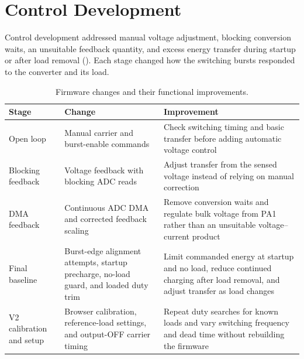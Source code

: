 \section{Control Development}
\label{sec:ctrl-comparison}

Control development addressed manual voltage adjustment, blocking conversion waits, an unsuitable feedback quantity, and excess energy transfer during startup or after load removal (). Each stage changed how the switching bursts responded to the converter and its load.

\begin{table}[htbp]
\centering
\caption{Firmware changes and their functional improvements.}
\label{tab:ctrl-version-identity}
\begin{tabularx}{\textwidth}{@{}L{0.17\textwidth}L{0.37\textwidth}Y@{}}
\toprule
Stage & Change & Improvement\\
\midrule
Open loop & Manual carrier and burst-enable commands & Check switching timing and basic transfer before adding automatic voltage control\\
Blocking feedback & Voltage feedback with blocking ADC reads & Adjust transfer from the sensed voltage instead of relying on manual correction\\
DMA feedback & Continuous ADC DMA and corrected feedback scaling & Remove conversion waits and regulate bulk voltage from PA1 rather than an unsuitable voltage--current product\\
Final baseline & Burst-edge alignment attempts, startup precharge, no-load guard, and loaded duty trim & Limit commanded energy at startup and no load, reduce continued charging after load removal, and adjust transfer as load changes\\
V2 calibration and setup & Browser calibration, reference-load settings, and output-OFF carrier timing & Repeat duty searches for known loads and vary switching frequency and dead time without rebuilding the firmware\\
\bottomrule
\end{tabularx}
\end{table}





